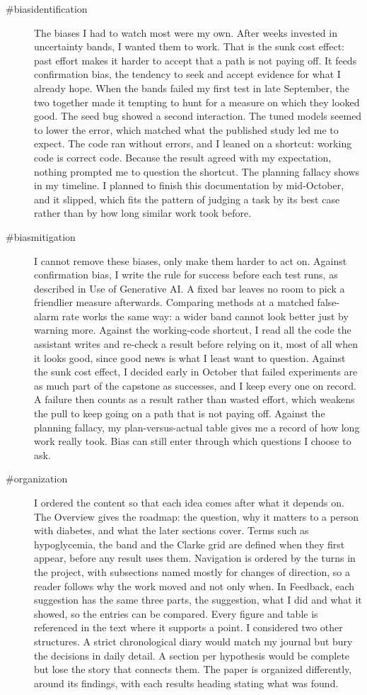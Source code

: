 \begin{description}
\item[\#biasidentification] The biases I had to watch most were my own. After weeks invested in uncertainty bands, I wanted them to work. That is the sunk cost effect: past effort makes it harder to accept that a path is not paying off. It feeds confirmation bias, the tendency to seek and accept evidence for what I already hope. When the bands failed my first test in late September, the two together made it tempting to hunt for a measure on which they looked good. The seed bug showed a second interaction. The tuned models seemed to lower the error, which matched what the published study led me to expect. The code ran without errors, and I leaned on a shortcut: working code is correct code. Because the result agreed with my expectation, nothing prompted me to question the shortcut. The planning fallacy shows in my timeline. I planned to finish this documentation by mid-October, and it slipped, which fits the pattern of judging a task by its best case rather than by how long similar work took before.
\item[\#biasmitigation] I cannot remove these biases, only make them harder to act on. Against confirmation bias, I write the rule for success before each test runs, as described in Use of Generative AI. A fixed bar leaves no room to pick a friendlier measure afterwards. Comparing methods at a matched false-alarm rate works the same way: a wider band cannot look better just by warning more. Against the working-code shortcut, I read all the code the assistant writes and re-check a result before relying on it, most of all when it looks good, since good news is what I least want to question. Against the sunk cost effect, I decided early in October that failed experiments are as much part of the capstone as successes, and I keep every one on record. A failure then counts as a result rather than wasted effort, which weakens the pull to keep going on a path that is not paying off. Against the planning fallacy, my plan-versus-actual table gives me a record of how long work really took. Bias can still enter through which questions I choose to ask.
\item[\#organization] I ordered the content so that each idea comes after what it depends on. The Overview gives the roadmap: the question, why it matters to a person with diabetes, and what the later sections cover. Terms such as hypoglycemia, the band and the Clarke grid are defined when they first appear, before any result uses them. Navigation is ordered by the turns in the project, with subsections named mostly for changes of direction, so a reader follows why the work moved and not only when. In Feedback, each suggestion has the same three parts, the suggestion, what I did and what it showed, so the entries can be compared. Every figure and table is referenced in the text where it supports a point. I considered two other structures. A strict chronological diary would match my journal but bury the decisions in daily detail. A section per hypothesis would be complete but lose the story that connects them. The paper is organized differently, around its findings, with each results heading stating what was found.

\end{description}
